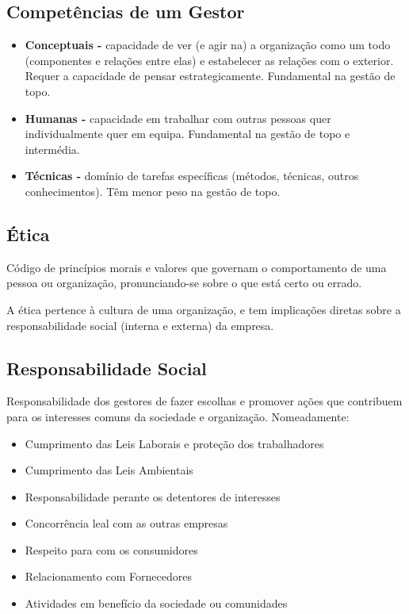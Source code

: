 \documentclass[11pt]{article}
\begin{document}
\subsection{Competências de um Gestor}

\begin{itemize}
    \item \textbf{Conceptuais -} capacidade de ver (e agir na) a organização como um todo (componentes e relações entre elas) e estabelecer as relações com o exterior. Requer a capacidade de pensar estrategicamente. Fundamental na gestão de topo.
    \item \textbf{Humanas -} capacidade em trabalhar com outras pessoas quer individualmente quer em equipa. Fundamental na gestão de topo e intermédia.
    \item \textbf{Técnicas -} domínio de tarefas específicas (métodos, técnicas, outros conhecimentos). Têm menor peso na gestão de topo.
\end{itemize}

\subsection{Ética}

Código de princípios morais e valores que governam o comportamento de uma pessoa ou organização, pronunciando-se sobre o que está certo ou errado.

A ética pertence à cultura de uma organização, e tem implicações diretas sobre a responsabilidade social (interna e externa) da empresa.

\subsection{Responsabilidade Social}

Responsabilidade dos gestores de fazer escolhas e promover ações que contribuem para os interesses comuns da sociedade e organização. Nomeadamente:
\begin{itemize}[topsep=0pt]
    \item Cumprimento das Leis Laborais e proteção dos trabalhadores
    \item Cumprimento das Leis Ambientais
    \item Responsabilidade perante os detentores de interesses
    \item Concorrência leal com as outras empresas
    \item Respeito para com os consumidores
    \item Relacionamento com Fornecedores
    \item Atividades em benefício da sociedade ou comunidades
\end{itemize}
\end{document}
